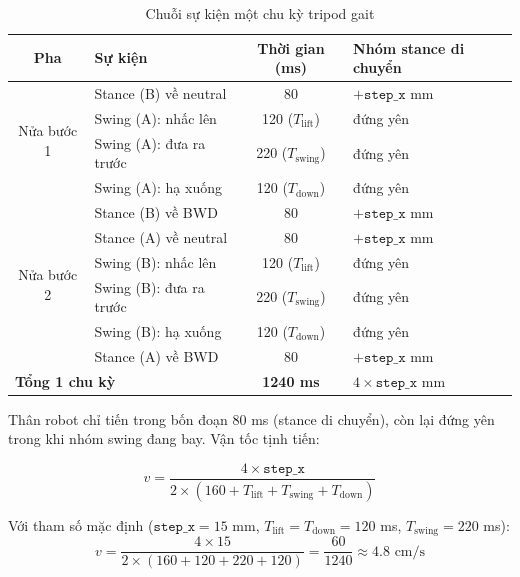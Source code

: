         \begin{table}[H]
        \centering
        \caption{Chuỗi sự kiện một chu kỳ tripod gait}
        \label{tab:tripod_timing}
        \begin{tabular}{|c|l|c|l|}
        \hline
        \textbf{Pha} & \textbf{Sự kiện} & \textbf{Thời gian (ms)} & \textbf{Nhóm stance di chuyển} \\
        \hline
        \multirow{4}{*}{Nửa bước 1} & Stance (B) về neutral & 80 & $+\mathtt{step\_x}$ mm \\
        & Swing (A): nhấc lên & 120 ($T_\mathrm{lift}$) & đứng yên \\
        & Swing (A): đưa ra trước & 220 ($T_\mathrm{swing}$) & đứng yên \\
        & Swing (A): hạ xuống & 120 ($T_\mathrm{down}$) & đứng yên \\
        & Stance (B) về BWD & 80 & $+\mathtt{step\_x}$ mm \\
        \hline
        \multirow{4}{*}{Nửa bước 2} & Stance (A) về neutral & 80 & $+\mathtt{step\_x}$ mm \\
        & Swing (B): nhấc lên & 120 ($T_\mathrm{lift}$) & đứng yên \\
        & Swing (B): đưa ra trước & 220 ($T_\mathrm{swing}$) & đứng yên \\
        & Swing (B): hạ xuống & 120 ($T_\mathrm{down}$) & đứng yên \\
        & Stance (A) về BWD & 80 & $+\mathtt{step\_x}$ mm \\
        \hline
        \multicolumn{2}{|l|}{\textbf{Tổng 1 chu kỳ}} & \textbf{1240 ms} & $4 \times \mathtt{step\_x}$ mm \\
        \hline
        \end{tabular}
        \end{table}

        \hspace{0.5cm} Thân robot chỉ tiến trong bốn đoạn 80 ms (stance di chuyển), còn lại đứng yên trong khi nhóm swing đang bay. Vận tốc tịnh tiến:

        \begin{equation}
            v = \frac{4 \times \mathtt{step\_x}}{2 \times (160 + T_\mathrm{lift} + T_\mathrm{swing} + T_\mathrm{down})}
        \end{equation}

        Với tham số mặc định ($\mathtt{step\_x} = 15$ mm, $T_\mathrm{lift} = T_\mathrm{down} = 120$ ms, $T_\mathrm{swing} = 220$ ms):
        \begin{equation}
            v = \frac{4 \times 15}{2 \times (160 + 120 + 220 + 120)} = \frac{60}{1240} \approx 4.8 \text{ cm/s}
        \end{equation}

